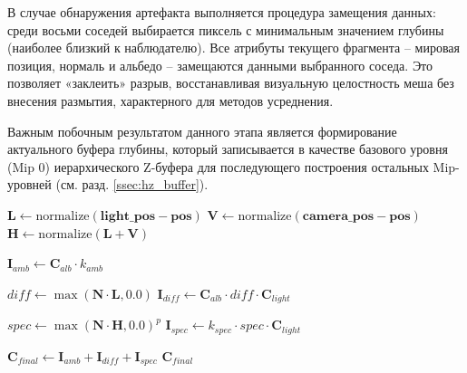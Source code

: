 В случае обнаружения артефакта выполняется процедура замещения данных: среди восьми соседей выбирается пиксель с минимальным значением глубины (наиболее близкий к наблюдателю). Все атрибуты текущего фрагмента -- мировая позиция, нормаль и альбедо -- замещаются данными выбранного соседа. Это позволяет «заклеить» разрыв, восстанавливая визуальную целостность меша без внесения размытия, характерного для методов усреднения.

Важным побочным результатом данного этапа является формирование актуального буфера глубины, который записывается в качестве базового уровня (Mip 0) иерархического Z-буфера для последующего построения остальных Mip-уровней (см. разд. \ref{ssec:hz_buffer}).

\begin{algorithm}[H]
    \SetAlFnt{\small\rmfamily}
    \SetAlCapFnt{\small\rmfamily}
    \SetAlCapNameFnt{\small\rmfamily}


    \BlankLine
    $\mathbf{L} \leftarrow \text{normalize}(\mathbf{light\_pos} - \mathbf{pos})$\;
    $\mathbf{V} \leftarrow \text{normalize}(\mathbf{camera\_pos} - \mathbf{pos})$\;
    $\mathbf{H} \leftarrow \text{normalize}(\mathbf{L} + \mathbf{V})$\;

    \BlankLine
    $\mathbf{I}_{amb} \leftarrow \mathbf{C}_{alb} \cdot k_{amb}$\;

    \BlankLine
    $diff \leftarrow \max(\mathbf{N} \cdot \mathbf{L}, 0.0)$\;
    $\mathbf{I}_{diff} \leftarrow \mathbf{C}_{alb} \cdot diff \cdot \mathbf{C}_{light}$\;

    \BlankLine
    $spec \leftarrow \max(\mathbf{N} \cdot \mathbf{H}, 0.0)^{p}$\;
    $\mathbf{I}_{spec} \leftarrow k_{spec} \cdot spec \cdot \mathbf{C}_{light}$\;

    \BlankLine
    $\mathbf{C}_{final} \leftarrow \mathbf{I}_{amb} + \mathbf{I}_{diff} + \mathbf{I}_{spec}$\;
    \Return $\mathbf{C}_{final}$\;

    \caption{Расчёт освещения (Blinn-Phong)}
    \label{alg:blinn_phong}
\end{algorithm}


